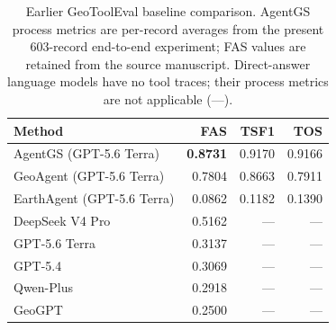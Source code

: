 \begin{table}[t]
\caption{Earlier GeoToolEval baseline comparison. AgentGS process metrics are per-record averages from the present 603-record end-to-end experiment; FAS values are retained from the source manuscript. Direct-answer language models have no tool traces; their process metrics are not applicable (---).}
\label{tab:prior-results}
\centering
\begin{tabularx}{\columnwidth}{@{}Xrrr@{}}
\toprule
Method & FAS & TSF1 & TOS \\
\midrule
AgentGS (GPT-5.6 Terra) & \textbf{0.8731} & 0.9170 & 0.9166 \\
GeoAgent (GPT-5.6 Terra) & 0.7804 & 0.8663 & 0.7911 \\
EarthAgent (GPT-5.6 Terra) & 0.0862 & 0.1182 & 0.1390 \\
DeepSeek V4 Pro & 0.5162 & --- & --- \\
GPT-5.6 Terra & 0.3137 & --- & --- \\
GPT-5.4 & 0.3069 & --- & --- \\
Qwen-Plus & 0.2918 & --- & --- \\
GeoGPT & 0.2500 & --- & --- \\
\bottomrule
\end{tabularx}
\end{table}
